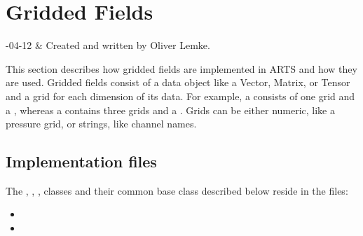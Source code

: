 %
%
\chapter{Gridded Fields}


%
%
-04-12 & Created and written by Oliver Lemke.\\
\stophistory




%
%

This section describes how gridded fields are implemented in ARTS and
how they are used. Gridded fields consist of a data object like a
Vector, Matrix, or Tensor and a grid for each dimension of its data.
For example, a  consists of one grid and a
, whereas a  contains three grids
and a . Grids can be either numeric, like a pressure grid,
or strings, like channel names.


\section{Implementation files}

The , ,
,  classes and their common
base class  described below reside in the files:

\begin{itemize}
\item {}
\item {}
\end{itemize}

